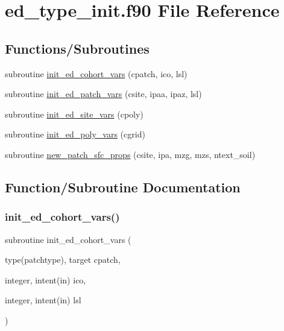 \hypertarget{ed__type__init_8f90}{}\section{ed\+\_\+type\+\_\+init.\+f90 File Reference}
\label{ed__type__init_8f90}
\subsection*{Functions/\+Subroutines}
\begin{DoxyCompactItemize}
\item 
subroutine \hyperlink{ed__type__init_8f90_af7c8e0a520dfca016f7eb7cf1c08b6ca}{init\+\_\+ed\+\_\+cohort\+\_\+vars} (cpatch, ico, lsl)
\item 
subroutine \hyperlink{ed__type__init_8f90_ad4cd2d9291dc969b63d1592d0f2a3164}{init\+\_\+ed\+\_\+patch\+\_\+vars} (csite, ipaa, ipaz, lsl)
\item 
subroutine \hyperlink{ed__type__init_8f90_a927351bf6adb1dbeb9ab1f434ef9e5b6}{init\+\_\+ed\+\_\+site\+\_\+vars} (cpoly)
\item 
subroutine \hyperlink{ed__type__init_8f90_a67afe21be4346c13ced583c229e2bb4c}{init\+\_\+ed\+\_\+poly\+\_\+vars} (cgrid)
\item 
subroutine \hyperlink{ed__type__init_8f90_aa6a689a6e6981ff6c33afcb419db9b28}{new\+\_\+patch\+\_\+sfc\+\_\+props} (csite, ipa, mzg, mzs, ntext\+\_\+soil)
\end{DoxyCompactItemize}


\subsection{Function/\+Subroutine Documentation}
\mbox{\label{ed__type__init_8f90_af7c8e0a520dfca016f7eb7cf1c08b6ca}} 
\subsubsection{\texorpdfstring{init\+\_\+ed\+\_\+cohort\+\_\+vars()}{init\_ed\_cohort\_vars()}}
{\footnotesize\ttfamily subroutine init\+\_\+ed\+\_\+cohort\+\_\+vars (\begin{DoxyParamCaption}\item[{type(patchtype), target}]{cpatch,  }\item[{integer, intent(in)}]{ico,  }\item[{integer, intent(in)}]{lsl }\end{DoxyParamCaption})}

